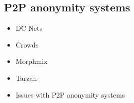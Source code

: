 \documentclass[../overview.tex]{subfiles}
\begin{document}
\subsection{P2P anonymity systems}
\begin{itemize}
	\item DC-Nets
	\item Crowds
	\item Morphmix
	\item Tarzan
	\item Issues with P2P anonymity systems
\end{itemize}
\end{document}
